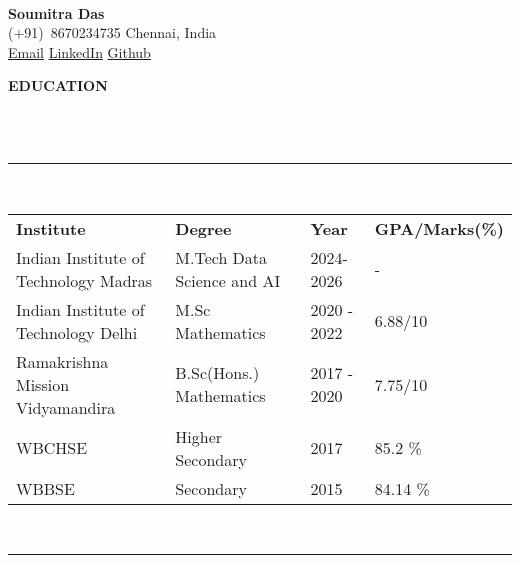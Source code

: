 \documentclass[a4paper,10pt]{article}
\newcommand\tab[1][0.5cm]{\hspace*{#1}}
\newcommand{\lsep}{-0.5cm}
\newcommand{\resheading}[1]{{\small \colorbox{mygrey}{\begin{minipage}{0.975\textwidth}{\textbf{#1 \vphantom{p\^{E}}}}\end{minipage}}}}
\begin{document}
\hspace{0.5cm}\\[-0.2cm]
\begin{center}
    
    \textbf{\huge Soumitra Das} \\
    (+91)\ 8670234735 \tab Chennai, India \\ 
    \href{mailto:soumitra.py@gmail.com}{Email} \tab
    \href{https://www.linkedin.com/in/soumitra-das-1b36901b9}{LinkedIn} \tab
    \href{https://github.com/soumitrapy}{Github}\\

\end{center}


\resheading{\textbf{EDUCATION} }\\[\lsep]
\\
\indent \rule{6.8in}{0.4pt}\\
\indent \begin{tabular}{ l @{\hskip 0.15in} l @{\hskip 0.15in} l @{\hskip 0.15in} l @{\hskip 0.15in} }
\noindent \textbf{Institute} & \textbf{Degree} & \textbf{Year} & \textbf{GPA/Marks(\%)}\\
Indian Institute of Technology Madras & M.Tech Data Science and AI & 2024-2026 & -\\
Indian Institute of Technology Delhi & M.Sc Mathematics & 2020 - 2022 & 6.88/10\\
Ramakrishna Mission Vidyamandira & B.Sc(Hons.) Mathematics & 2017 - 2020 & 7.75/10\\
WBCHSE & Higher Secondary & 2017 & 85.2 \% \\
WBBSE & Secondary & 2015 & 84.14 \% \\

\end{tabular}
\\
\indent \rule{6.8in}{0.4pt}
\\
\end{document}

